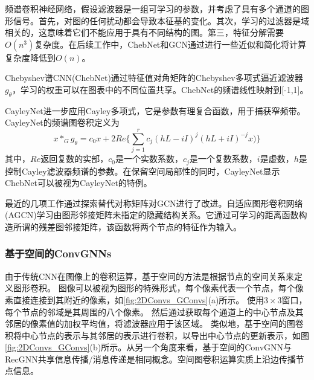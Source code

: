 频谱卷积神经网络，假设滤波器是一组可学习的参数，并考虑了具有多个通道的图形信号。首先，对图的任何扰动都会导致本征基的变化。其次，学习的过滤器是域相关的，这意味着它们不能应用于具有不同结构的图。第三，特征分解需要$O(n^3)$复杂度。在后续工作中，ChebNet和GCN通过进行一些近似和简化将计算复杂度降低到$O(n)$。

Chebyshev谱CNN(ChebNet)通过特征值对角矩阵的Chebyshev多项式逼近滤波器$g_{\theta}$，学习的权重可以在图表中的不同位置共享。ChebNet的频谱线性映射到[-1,1]。

CayleyNet进一步应用Cayley多项式，它是参数有理复合函数，用于捕获窄频带。CayleyNet的频谱图卷积定义为
\[
x*_Gg_{\theta}=c_0x+2Re\{\sum_{j=1}^{r}c_j(hL-iI)^j(hL+iI)^{-j}x)\}
\]
其中，$Re$返回复数的实部，$c_0$是一个实数系数，$c_j$是一个复数系数，$i$是虚数，$h$是控制Cayley滤波器频谱的参数。在保留空间局部性的同时，CayleyNet显示ChebNet可以被视为CayleyNet的特例。

  
最近的几项工作通过探索替代对称矩阵对GCN进行了改进。自适应图形卷积网络(AGCN)学习由图形邻接矩阵未指定的隐藏结构关系。它通过可学习的距离函数构造所谓的残差图邻接矩阵，该函数将两个节点的特征作为输入。

\subsubsection{基于空间的ConvGNNs}
由于传统CNN在图像上的卷积运算，基于空间的方法是根据节点的空间关系来定义图形卷积。
图像可以被视为图形的特殊形式，每个像素代表一个节点，每个像素直接连接到其附近的像素，如\ref{fig:2DConvs_GConvs}(a)所示。
使用$3\times 3$窗口，每个节点的邻域是其周围的八个像素。
然后通过获取每个通道上的中心节点及其邻居的像素值的加权平均值，将滤波器应用于该区域。
类似地，基于空间的图卷积将中心节点的表示与其邻居的表示进行卷积，以导出中心节点的更新表示，如图\ref{fig:2DConvs_GConvs}(b)所示。从另一个角度来看，基于空间的ConvGNN与RecGNN共享信息传播/消息传递是相同概念。空间图卷积运算实质上沿边传播节点信息。

